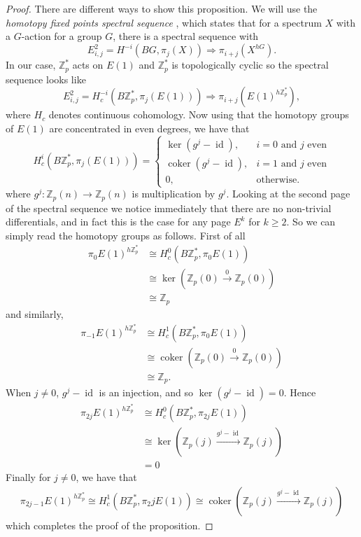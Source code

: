 \documentclass[a4paper]{article} %
\theoremstyle{definition}
\newcommand{\toWithMapLong}[1]{\overset{#1}{\longrightarrow}}
\newcommand{\Z}{\mathbb{Z}}
\DeclareMathOperator{\id}{id}           %
\DeclareMathOperator{\coker}{coker}     %
\renewcommand{\implies}{\Rightarrow}    %
\begin{document}
\begin{proof}
There are different ways to show this proposition. We will use the \textit{homotopy fixed points spectral sequence} , which states that for a spectrum $X$ with a $G$-action for a group $G$, there is a spectral sequence with
\[
E^2_{i,j} = H^{-i}(BG, \pi_j(X)) \implies \pi_{i+j}(X^{hG}).
\]
In our case, $\Z_p^*$ acts on $E(1)$ and $\Z_p^*$ is topologically cyclic so the spectral sequence looks like
\[
E^2_{i,j} = H_c^{-i}(B\Z_p^*, \pi_j(E(1))) \implies \pi_{i+j}(E(1)^{h\Z_p^*}),
\]
where $H_c$ denotes continuous cohomology. Now using that the homotopy groups of $E(1)$ are concentrated in even degrees, we have that
\[
  H^i_c(B\Z_p^*, \pi_j(E(1))) =
\begin{cases}
\ker (g^j - \id), & i=0 \text{ and } j \text{ even} \\
\coker (g^j - \id), & i=1 \text{ and } j \text{ even} \\
0, & \text{otherwise.}
\end{cases}
\]
where $g^j \colon \Z_p(n) \to \Z_p(n)$ is multiplication by $g^j$. Looking at the second page of the spectral sequence  we notice immediately that there are no non-trivial differentials, and in fact this is the case for any page $E^k$ for $k \ge 2$. So we can simply read  the homotopy groups as follows. First of all
\begin{align*}
  \pi_0 E(1)^{h\Z_p^*} & \cong  H^0_c(B\Z_p^*, \pi_0 E(1)) \\
    & \cong \ker (\Z_p(0) \toWithMapLong{0} \Z_p(0)) \\
    & \cong \Z_p
\end{align*}
and similarly,
\begin{align*}
  \pi_{-1} E(1)^{h\Z_p^*} & \cong  H^1_c(B\Z_p^*, \pi_0 E(1)) \\
    & \cong \coker (\Z_p(0) \toWithMapLong{0} \Z_p(0)) \\
    & \cong \Z_p.
\end{align*}
When $j \neq 0$, $g^j - \id$ is an injection, and so $\ker(g^j - \id) = 0$. Hence
\begin{align*}
  \pi_{2j} E(1)^{h\Z_p^*} & \cong  H^0_c(B\Z_p^*, \pi_{2j} E(1)) \\
    & \cong \ker (\Z_p(j) \toWithMapLong{g^j - \id} \Z_p(j)) \\
    &  = 0
\end{align*}
Finally for $j \neq 0$, we have that
\begin{align*}
  \pi_{2j-1} E(1)^{h\Z_p^*}  \cong  H^1_c(B\Z_p^*, \pi_2j E(1))
    \cong \coker (\Z_p(j) \toWithMapLong{g^j - \id} \Z_p(j))
\end{align*}
which completes the proof of the proposition.
\end{proof}
\end{document}
